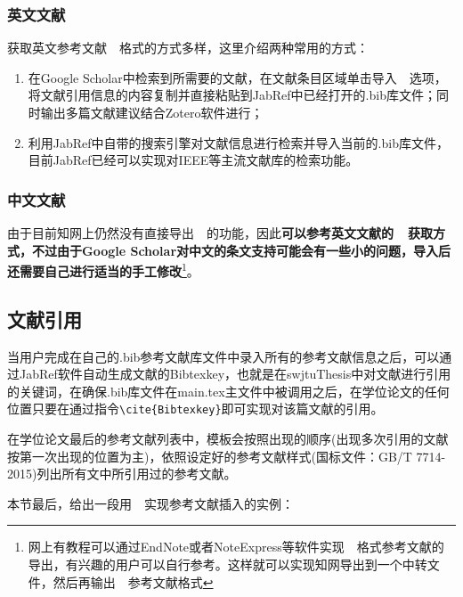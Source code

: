 \subsubsection{英文文献}
获取英文参考文献~\BibTeX{}~格式的方式多样，这里介绍两种常用的方式：
\par
\begin{enumerate}
  \item 在Google Scholar中检索到所需要的文献，在文献条目区域单击导入~\BibTeX{}~选项，将文献引用信息的内容复制并直接粘贴到JabRef中已经打开的.bib库文件；同时输出多篇文献建议结合Zotero软件进行；
  \item 利用JabRef中自带的搜索引擎对文献信息进行检索并导入当前的.bib库文件，目前JabRef已经可以实现对IEEE等主流文献库的检索功能。
\end{enumerate}

\subsubsection{中文文献}
由于目前知网上仍然没有直接导出~\BibTeX{}~的功能，因此\textbf{可以参考英文文献的~\BibTeX{}~获取方式，不过由于Google Scholar对中文的条文支持可能会有一些小的问题，导入后还需要自己进行适当的手工修改}\footnote{网上有教程可以通过EndNote或者NoteExpress等软件实现~\BibTeX{}~格式参考文献的导出，有兴趣的用户可以自行参考。这样就可以实现知网导出到一个中转文件，然后再输出~\BibTeX{}~参考文献格式}。

\subsection{文献引用}
当用户完成在自己的.bib参考文献库文件中录入所有的参考文献信息之后，可以通过JabRef软件自动生成文献的Bibtexkey，也就是在swjtuThesis中对文献进行引用的关键词，在确保.bib库文件在main.tex主文件中被调用之后，在学位论文的任何位置只要在通过指令\verb|\cite{Bibtexkey}|即可实现对该篇文献的引用。

\par
在学位论文最后的参考文献列表中，模板会按照出现的顺序(出现多次引用的文献按第一次出现的位置为主)，依照设定好的参考文献样式(国标文件：GB/T 7714-2015)列出所有文中所引用过的参考文献。

\par
本节最后，给出一段用~\BibTeX{}~实现参考文献插入的实例：

